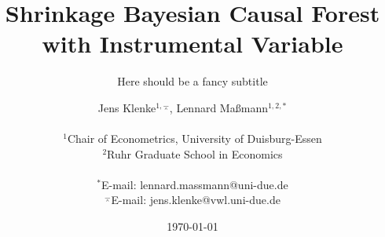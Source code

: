 \documentclass[oneside, english, reqno, 11pt, headsepline, BCOR=8.5mm]{scrbook} %
\title{Shrinkage Bayesian Causal Forest with Instrumental Variable}
\subtitle{Here should be a fancy subtitle}
\author
{Jens Klenke$^{1,\barwedge}$, Lennard Ma{\ss}mann$^{1,2,\ast}$ \\
\\
\normalsize{$^{1}$Chair of Econometrics, University of Duisburg-Essen}\\
\normalsize{$^{2}$Ruhr Graduate School in Economics}\\
\\
\normalsize{$^\ast$E-mail:  lennard.massmann@uni-due.de}\\
\normalsize{$^\barwedge$E-mail:  jens.klenke@vwl.uni-due.de}\\
}
\date{\today}
\numberwithin{equation}{section}
\numberwithin{figure}{section}
\theoremstyle{Theorem}
\theoremstyle{Definition}
\newcommand\summaryname{Abstract}
\newenvironment{Abstract}%
    {\small\begin{center}%
    \bfseries{\summaryname} \end{center}}
\begin{document}
\frontmatter
%
\maketitle


\cleardoublepage


\begin{Abstract}
\begin{changemargin}{1cm}{1cm}
  This paper focuses on improving the estimation of heterogeneous treatment effects in observational studies under sparsity and conditions of imperfect compliance using instrumental variables (IV).
  Traditional IV methods, such as two-stage least squares (2SLS), often impose linearity assumptions that may not hold in complex empirical settings.
  To address these limitations, the Bayesian Instrumental Variable Causal Forest (BCF-IV) framework has been developed to estimate the conditional Complier Average Causal Effect (CACE) non-parametrically while retaining interpretability.
  BCF-IV, based on the Bayesian Additive Regression Trees (BART) algorithm, identifies treatment effect heterogeneity and estimates conditional CACE using 2SLS leafwise. 
  This research contributes in two significant ways by proposing the Shrinkage Bayesian Instrumental Variable Causal Forest (SBCF-IV) algorithm. 
  First, the paper adopts the SoftBART algorithm, which integrates shrinkage priors to enable more precise treatment effect estimation in the presence of sparse data.
  Second, the paper refines the discovery of heterogeneous subgroups by incorporating posterior splitting probabilities into the decision-making process.
  These probabilities are used to scale the cost function during subgroup construction, leading to more accurate identification of meaningful subgroups.
  The approach of SBCF-IV enhances the ability to manage sparse data and improves the detection of variables that drive treatment effect heterogeneity. A simulation study suggests improved adaptability and interpretability in estimating conditional CACE, particularly in scenarios with sparsity, confounding and nonlinearity.
\end{changemargin}
\end{Abstract}

\cleardoublepage

\end{document}
